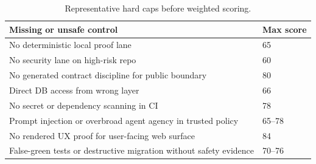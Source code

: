\begin{table}[t]
\caption{Representative hard caps before weighted scoring.}
\label{tab:hard-caps}
\centering
\scriptsize
\begin{tabularx}{\columnwidth}{Y L{0.18\columnwidth}}
\toprule
\textbf{Missing or unsafe control} & \textbf{Max score} \\
\midrule
No deterministic local proof lane & 65 \\
No security lane on high-risk repo & 60 \\
No generated contract discipline for public boundary & 80 \\
Direct DB access from wrong layer & 66 \\
No secret or dependency scanning in CI & 78 \\
Prompt injection or overbroad agent agency in trusted policy & 65--78 \\
No rendered UX proof for user-facing web surface & 84 \\
False-green tests or destructive migration without safety evidence & 70--76 \\
\bottomrule
\end{tabularx}
\end{table}
